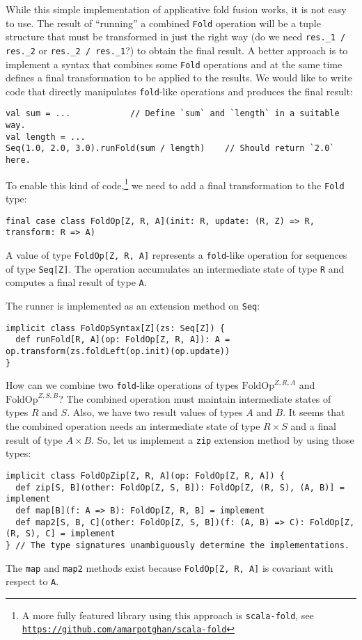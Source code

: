 While this simple implementation of applicative fold fusion works,
it is not easy to use. The result of \textsf{``}running\textsf{''} a combined \lstinline!Fold!
operation will be a tuple structure that must be transformed in just
the right way (do we need \lstinline!res._1 / res._2! or \lstinline!res._2 / res._1!?)
to obtain the final result. A better approach is to implement a syntax
that combines some \lstinline!Fold! operations and at the same time
defines a final transformation to be applied to the results. We would
like to write code that directly manipulates \lstinline!fold!-like
operations and produces the final result:
\begin{lstlisting}
val sum = ...            // Define `sum` and `length` in a suitable way.
val length = ...
Seq(1.0, 2.0, 3.0).runFold(sum / length)    // Should return `2.0` here.
\end{lstlisting}

To enable this kind of code,\footnote{A more fully featured library using this approach is \texttt{scala-fold},
see \texttt{\href{https://github.com/amarpotghan/scala-fold}{https://github.com/amarpotghan/scala-fold}} } we need to add a final transformation to the \lstinline!Fold! type:
\begin{lstlisting}
final case class FoldOp[Z, R, A](init: R, update: (R, Z) => R, transform: R => A)
\end{lstlisting}
A value of type \lstinline!FoldOp[Z, R, A]! represents a \lstinline!fold!-like
operation for sequences of type \lstinline!Seq[Z]!. The operation
accumulates an intermediate state of type \lstinline!R! and computes
a final result of type \lstinline!A!.

The runner is implemented as an extension method on \lstinline!Seq!:
\begin{lstlisting}
implicit class FoldOpSyntax[Z](zs: Seq[Z]) {
  def runFold[R, A](op: FoldOp[Z, R, A]): A = op.transform(zs.foldLeft(op.init)(op.update))
}
\end{lstlisting}

How can we combine two \lstinline!fold!-like operations of types
$\text{FoldOp}^{Z,R,A}$ and $\text{FoldOp}^{Z,S,B}$? The combined
operation must maintain intermediate states of types $R$ and $S$.
Also, we have two result values of types $A$ and $B$. It seems that
the combined operation needs an intermediate state of type $R\times S$
and a final result of type $A\times B$. So, let us implement a \lstinline!zip!
extension method by using those types:
\begin{lstlisting}
implicit class FoldOpZip[Z, R, A](op: FoldOp[Z, R, A]) {
  def zip[S, B](other: FoldOp[Z, S, B]): FoldOp[Z, (R, S), (A, B)] = implement
  def map[B](f: A => B): FoldOp[Z, R, B] = implement
  def map2[S, B, C](other: FoldOp[Z, S, B])(f: (A, B) => C): FoldOp[Z, (R, S), C] = implement
} // The type signatures unambiguously determine the implementations.
\end{lstlisting}
The \lstinline!map! and \lstinline!map2! methods exist because \lstinline!FoldOp[Z, R, A]!
is covariant with respect to \lstinline!A!.

